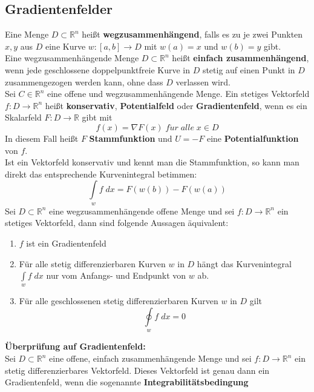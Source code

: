 \documentclass[a4paper,twocolumn,10pt]{article}
\begin{document}
\subsection{Gradientenfelder}
Eine Menge $D\subset\mathbb{R}^n$ heißt \textbf{wegzusammenhängend}, falls es zu je zwei Punkten $x,y$ aus $D$ eine Kurve $w:[a,b]\rightarrow D$ mit $w(a)=x$ und $w(b)=y$ gibt.\\
Eine wegzusammenhängende Menge $D\subset\mathbb{R}^n$ heißt \textbf{einfach zusammenhängend}, wenn jede geschlossene doppelpunktfreie Kurve in $D$ stetig auf einen Punkt in $D$ zusammengezogen werden kann, ohne dass $D$ verlassen wird.\\
Sei $C\in\mathbb{R}^n$ eine offene und wegzusammenhängende Menge. Ein stetiges Vektorfeld $f:D\rightarrow\mathbb{R}^n$ heißt \textbf{konservativ}, \textbf{Potentialfeld} oder \textbf{Gradientenfeld}, wenn es ein Skalarfeld $F:D\rightarrow\mathbb{R}$ gibt mit
\begin{equation*}
f(x)=\nabla F(x)\;f\ddot{u}r\;alle\;x\in D
\end{equation*}
In diesem Fall heißt $F$ \textbf{Stammfunktion} und $U=-F$ eine \textbf{Potentialfunktion} von $f$.\\
Ist ein Vektorfeld konservativ und kennt man die Stammfunktion, so kann man direkt das entsprechende Kurvenintegral betimmen:
\begin{equation*}
\int\limits_{w}f\;dx=F(w(b))-F(w(a))
\end{equation*}
Sei $D\subset\mathbb{R}^n$ eine wegzusammenhängende offene Menge und sei $f:D\rightarrow\mathbb{R}^n$ ein stetiges Vektorfeld, dann sind folgende Aussagen äquivalent:
\begin{enumerate}[label=$\bullet$]
\item $f$ ist ein Gradientenfeld
\item Für alle stetig differenzierbaren Kurven $w$ in $D$ hängt das Kurvenintegral $\int\limits_{w}f\;dx$ nur vom Anfangs- und Endpunkt von $w$ ab.
\item Für alle geschlossenen stetig differenzierbaren Kurven $w$ in $D$ gilt
\begin{equation*}
\oint\limits_{w} f\;dx=0
\end{equation*}
\end{enumerate}
\textbf{Überprüfung auf Gradientenfeld:}\\
Sei $D\subset\mathbb{R}^n$ eine offene, einfach zusammenhängende Menge und sei $f:D\rightarrow\mathbb{R}^n$ ein stetig differenzierbares Vektorfeld. Dieses Vektorfeld ist genau dann ein Gradientenfeld, wenn die sogenannte \textbf{Integrabilitätsbedingung}
\end{document}
